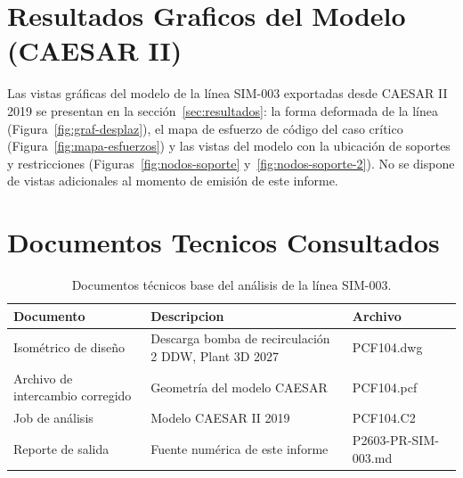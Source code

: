 \appendix
\section{Resultados Graficos del Modelo (CAESAR II)}
\label{appendix:graficos}

Las vistas gr\'{a}ficas del modelo de la l\'{i}nea SIM-003 exportadas desde
CAESAR II 2019 se presentan en la secci\'{o}n~\ref{sec:resultados}: la forma
deformada de la l\'{i}nea (Figura~\ref{fig:graf-desplaz}), el mapa de esfuerzo
de c\'{o}digo del caso cr\'{i}tico (Figura~\ref{fig:mapa-esfuerzos}) y las
vistas del modelo con la ubicaci\'{o}n de soportes y restricciones
(Figuras~\ref{fig:nodos-soporte} y~\ref{fig:nodos-soporte-2}). No se dispone de
vistas adicionales al momento de emisi\'{o}n de este informe.

\section{Documentos Tecnicos Consultados}
\label{appendix:documentos}

\begin{table}[htbp]
    \centering
    \footnotesize
    \caption{Documentos t\'{e}cnicos base del an\'{a}lisis de la l\'{i}nea SIM-003.}
    \label{tab:planos}
    \begin{tabular}{@{}lll@{}}
        \toprule
        \textbf{Documento} & \textbf{Descripcion} & \textbf{Archivo} \\
        \midrule
        Isom\'{e}trico de dise\~{n}o & Descarga bomba de recirculaci\'{o}n 2 DDW, Plant 3D 2027 & PCF104.dwg \\
        Archivo de intercambio corregido & Geometr\'{i}a del modelo CAESAR & PCF104.pcf \\
        Job de an\'{a}lisis & Modelo CAESAR II 2019 & PCF104.C2 \\
        Reporte de salida & Fuente num\'{e}rica de este informe & P2603-PR-SIM-003.md \\
        \bottomrule
    \end{tabular}
\end{table}
